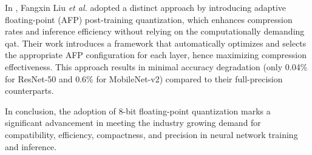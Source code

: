 In \cite{liu2021improving}, Fangxin Liu \textit{et al.} adopted a distinct approach by introducing adaptive floating-point (AFP) post-training quantization, which enhances compression rates and inference efficiency without relying on the computationally demanding \gls{qat}. Their work introduces a framework that automatically optimizes and selects the appropriate AFP configuration for each layer, hence maximizing compression effectiveness. This approach results in minimal accuracy degradation (only 0.04\% for ResNet-50 and 0.6\% for MobileNet-v2) compared to their full-precision counterparts.

In conclusion, the adoption of 8-bit floating-point quantization marks a significant advancement in meeting the industry growing demand for compatibility, efficiency, compactness, and precision in neural network training and inference.